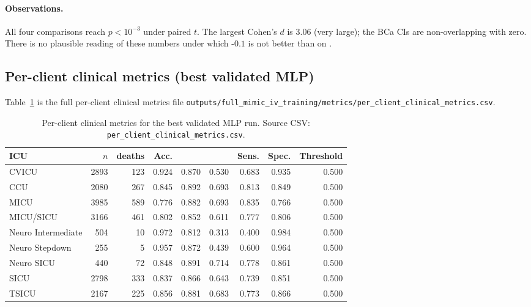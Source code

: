 \paragraph{Observations.}
All four comparisons reach $p \!<\! 10^{-3}$ under paired $t$. The
largest Cohen's $d$ is $3.06$ (very large); the BCa CIs are
non-overlapping with zero. There is no plausible reading of these
numbers under which \fedprox{}-$0.1$ is not better than \fedavg{}
on \auprc{}.

\subsection{Per-client clinical metrics (best validated MLP)}

Table~\ref{tab:per-client-clinical-full} is the full per-client
clinical metrics file
\texttt{outputs/full\_mimic\_iv\_training/metrics/per\_client\_clinical\_metrics.csv}.

\begin{table}[h]
\centering
\caption{Per-client clinical metrics for the best validated MLP run.
Source CSV: \texttt{per\_client\_clinical\_metrics.csv}.}
\label{tab:per-client-clinical-full}
\small
\begin{tabular}{l r r r r r r r r}
\toprule
ICU                & $n$  & deaths & Acc. & \auroc{} & \auprc{} & Sens. & Spec. & Threshold \\
\midrule
CVICU              & 2893 & 123 & 0.924 & 0.870 & 0.530 & 0.683 & 0.935 & 0.500 \\
CCU                & 2080 & 267 & 0.845 & 0.892 & 0.693 & 0.813 & 0.849 & 0.500 \\
MICU               & 3985 & 589 & 0.776 & 0.882 & 0.693 & 0.835 & 0.766 & 0.500 \\
MICU/SICU          & 3166 & 461 & 0.802 & 0.852 & 0.611 & 0.777 & 0.806 & 0.500 \\
Neuro Intermediate &  504 &  10 & 0.972 & 0.812 & 0.313 & 0.400 & 0.984 & 0.500 \\
Neuro Stepdown     &  255 &   5 & 0.957 & 0.872 & 0.439 & 0.600 & 0.964 & 0.500 \\
Neuro SICU         &  440 &  72 & 0.848 & 0.891 & 0.714 & 0.778 & 0.861 & 0.500 \\
SICU               & 2798 & 333 & 0.837 & 0.866 & 0.643 & 0.739 & 0.851 & 0.500 \\
TSICU              & 2167 & 225 & 0.856 & 0.881 & 0.683 & 0.773 & 0.866 & 0.500 \\
\bottomrule
\end{tabular}
\end{table}

